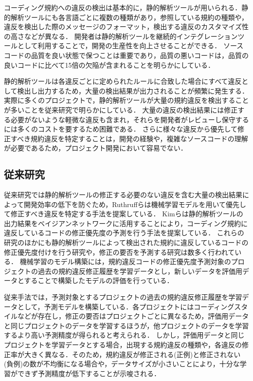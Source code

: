 \documentclass[paper]{ieicej}
\begin{document}
コーディング規約への違反の検出は基本的に，静的解析ツールが用いられる．静的解析ツールにも各言語ごとに複数の種類があり，参照している規約の種類や，違反を検出した際のメッセージのフォーマット，検出する違反のカスタマイズ性の高さなどが異なる．
開発者は静的解析ツールを継続的インテグレーションツールとして利用することで，開発の生産性を向上させることができる．
ソースコードの品質を良い状態で保つことは重要であり，品質の悪いコードは，品質の良いコードに比べて15倍の欠陥が含まれることを明らかにしている\cite{静的解析ツールの効果}．

静的解析ツールは各違反ごとに定められたルールに合致した場合にすべて違反として検出し出力するため，大量の検出結果が出力されることが頻繁に発生する．実際に多くのプロジェクトで，静的解析ツールが大量の規約違反を検出することが多いことを従来研究で明らかにしている\cite{UsingStaticAnalysisTools2}．
大量の違反の検出結果には修正する必要がないような軽微な違反も含まれ，それらを開発者がレビューし保守するには多くのコストを要するため困難である．
さらに様々な違反から優先して修正すべき規約違反を特定することは，開発の経験や，複雑なソースコードの理解が必要であるため，プロジェクト開発において容易でない\cite{shuseisarenai}．


\subsection{従来研究}

従来研究では静的解析ツールの修正する必要のない違反を含む大量の検出結果によって開発効率の低下を防ぐため，Ruthruffらは機械学習モデルを用いて優先して修正すべき違反を特定する手法を提案している\cite{JyuraiPre}．
Kimらは静的解析ツールの出力結果をベイジアンネットワークに活用することにより，コーディング規約に違反しているコードの修正優先度の予測を行う手法を提案している\cite{beizu}．
これらの研究のほかにも静的解析ツールによって検出された規約に違反しているコードの修正優先度付けを行う研究や，修正の要否を予測する研究は数多く行われている\cite{Wang}\cite{Qing}\cite{HowFar}．
機械学習のモデル構築には，規約違反コードの修正優先度予測対象のプロジェクトの過去の規約違反修正履歴を学習データとし，新しいデータを評価用データとすることで構築したモデルの評価を行っている．

従来手法では，予測対象とするプロジェクトの過去の規約違反修正履歴を学習データとして，予測モデルを構築している．各プロジェクトにはコーディングスタイルなどが存在し，修正の要否はプロジェクトごとに異なるため，評価用データと同じプロジェクトのデータを学習するほうが，他プロジェクトのデータを学習するより高い予測精度が得られると考えられる．
しかし，評価用データと同じプロジェクトを学習データとする場合，出現する規約違反の種類や，各違反の修正率が大きく異なる\cite{Panichella}．そのため，規約違反が修正される(正例)と修正されない(負例)の数が不均衡になる場合や，データサイズが小さいことにより，十分な学習ができず予測精度が低下することが示唆される．
\end{document}

